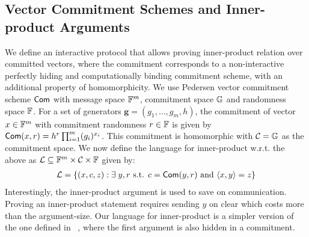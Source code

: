 \subsection{Vector Commitment Schemes and Inner-product Arguments}
We define an interactive protocol that allows proving inner-product relation over committed vectors, where the commitment corresponds to a non-interactive perfectly hiding and computationally binding commitment scheme, with an additional property of homomorphicity.  We use Pedersen vector commitment scheme $\mathsf{Com}$ with message space $\mathbb{F}^m$,
commitment space $\mathbb{G}$ and randomness space $\mathbb{F}$. For a set of generators
$\bm{g}=(g_1,\ldots,g_m,h)$, the commitment of vector $x\in \mathbb{F}^m$ with commitment
randomness $r\in \mathbb{F}$ is given by $\mathsf{Com}(x,r)=h^r \prod_{i=1}^m (g_i)^{x_i} $.
This commitment is homomorphic with $\mathcal{C}=\mathbb{G}$ as the commitment space.
We now define the language for inner-product w.r.t. the above  as $\mathcal{L}
\subseteq \mathbb{F}^m \times \mathcal{C} \times \mathbb{F}$ given by:
{\small
\begin{equation*}
\begin{array}{l}
\mathcal{L} = \{(x,c,z):\exists \; y,r \text{ s.t. } 
c=\mathsf{Com}(y,r)  \text{ and } \langle x,y\rangle=z\} 
\end{array}
\end{equation*}
}
 Interestingly, the inner-product argument is used to save on communication.
Proving  an inner-product statement requires sending $y$ on clear which costs
more than the argument-size. Our language for inner-product is a simpler version
of the one defined in ~\cite{bulletproofs}, where the first argument is also hidden in a commitment. 
